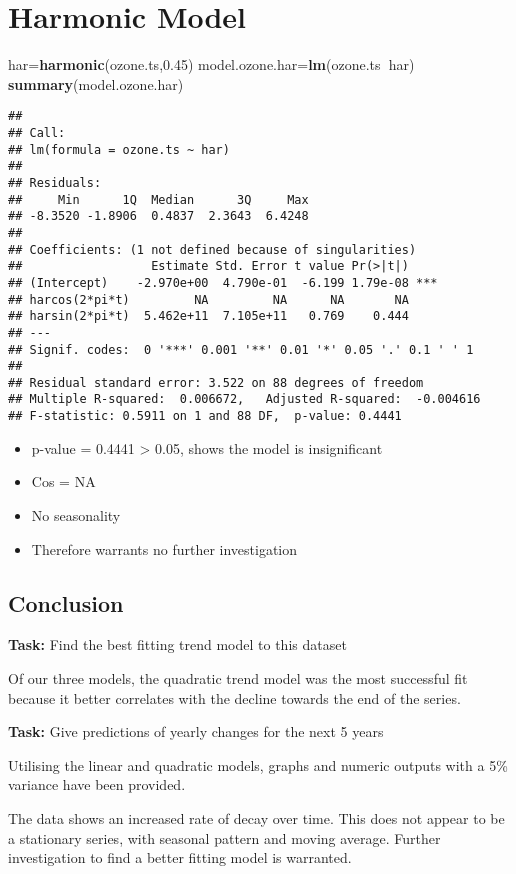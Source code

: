 \documentclass[]{article}
\newenvironment{Shaded}{\begin{snugshade}}{\end{snugshade}}
\newcommand{\FloatTok}[1]{\textcolor[rgb]{0.00,0.00,0.81}{#1}}
\newcommand{\KeywordTok}[1]{\textcolor[rgb]{0.13,0.29,0.53}{\textbf{#1}}}
\newcommand{\NormalTok}[1]{#1}
\newcommand{\OperatorTok}[1]{\textcolor[rgb]{0.81,0.36,0.00}{\textbf{#1}}}
\providecommand{\tightlist}{%
  \setlength{\itemsep}{0pt}\setlength{\parskip}{0pt}}
\begin{document}
\hypertarget{harmonic-model}{%
\section{Harmonic Model}\label{harmonic-model}}

\begin{Shaded}
\begin{Highlighting}[]
\NormalTok{har=}\KeywordTok{harmonic}\NormalTok{(ozone.ts,}\FloatTok{0.45}\NormalTok{)}
\NormalTok{model.ozone.har=}\KeywordTok{lm}\NormalTok{(ozone.ts}\OperatorTok{~}\NormalTok{har)}
\KeywordTok{summary}\NormalTok{(model.ozone.har)}
\end{Highlighting}
\end{Shaded}

\begin{verbatim}
## 
## Call:
## lm(formula = ozone.ts ~ har)
## 
## Residuals:
##     Min      1Q  Median      3Q     Max 
## -8.3520 -1.8906  0.4837  2.3643  6.4248 
## 
## Coefficients: (1 not defined because of singularities)
##                  Estimate Std. Error t value Pr(>|t|)    
## (Intercept)    -2.970e+00  4.790e-01  -6.199 1.79e-08 ***
## harcos(2*pi*t)         NA         NA      NA       NA    
## harsin(2*pi*t)  5.462e+11  7.105e+11   0.769    0.444    
## ---
## Signif. codes:  0 '***' 0.001 '**' 0.01 '*' 0.05 '.' 0.1 ' ' 1
## 
## Residual standard error: 3.522 on 88 degrees of freedom
## Multiple R-squared:  0.006672,   Adjusted R-squared:  -0.004616 
## F-statistic: 0.5911 on 1 and 88 DF,  p-value: 0.4441
\end{verbatim}

\begin{itemize}
\tightlist
\item
  p-value = 0.4441 \textgreater{} 0.05, shows the model is insignificant
\item
  Cos = NA
\item
  No seasonality
\item
  Therefore warrants no further investigation
\end{itemize}

\hypertarget{conclusion}{%
\subsection{Conclusion}\label{conclusion}}

\textbf{Task:} Find the best fitting trend model to this dataset

Of our three models, the quadratic trend model was the most successful
fit because it better correlates with the decline towards the end of the
series.

\textbf{Task:} Give predictions of yearly changes for the next 5 years

Utilising the linear and quadratic models, graphs and numeric outputs
with a 5\% variance have been provided.

The data shows an increased rate of decay over time. This does not
appear to be a stationary series, with seasonal pattern and moving
average. Further investigation to find a better fitting model is
warranted.
\end{document}
